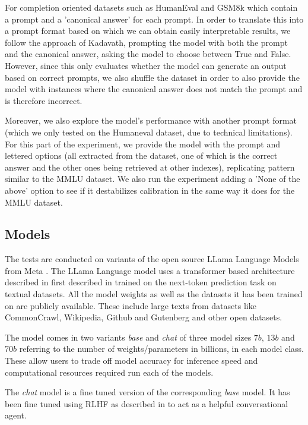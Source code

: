 \documentclass[11pt]{article}
\begin{document}
For completion oriented datasets such as HumanEval and GSM8k which 
contain a prompt and a 'canonical answer' for each prompt. In order to 
translate this into a prompt format based on which we can obtain easily 
interpretable results, we follow the approach of Kadavath, prompting 
the model with both the prompt and the canonical answer, asking the 
model to choose between True and False. However, since this only 
evaluates whether the model can generate an output based on correct 
prompts, we also shuffle the dataset in order to also provide the model 
with instances where the canonical answer does not match the prompt 
and is therefore incorrect. 

Moreover, we also explore the model's performance with another prompt format (which we only tested on the Humaneval dataset, due to technical limitations). For this part of the experiment, we provide the model with the prompt and lettered options (all extracted from the dataset, one of which is the correct answer and the other ones being retrieved at other indexes), replicating pattern similar to the MMLU dataset. We also run the experiment adding a 'None of the above' option to see if it destabilizes calibration in the same way it does for the MMLU dataset.
\fi


\subsection{Models}

The tests are conducted on variants of the  open source LLama 
Language Models from Meta \cite{touvron2023llama}. The LLama Language model 
uses a transformer based architecture described in first described in 
\cite{VaswaniSPUJGKP17} trained on the next-token prediction task on 
textual datasets. All the model weights as well as the datasets it has 
been trained on are publicly available. These include large texts from  
datasets like CommonCrawl, Wikipedia, Github and Gutenberg and other 
open datasets. 

The model comes in two variants \emph{base} and \emph{chat} of three 
model sizes $7b$, $13b$ and $70b$ referring to the number of weights/parameters in billions, 
in each model class. These allow users to trade off model accuracy for inference speed 
and computational resources required run each of the models. 

The \emph{chat} model is a fine tuned version of the 
corresponding \emph{base} model. It has been fine tuned using 
RLHF as described in \cite{ouyang2022training} to act 
as a helpful conversational agent.
\end{document}
